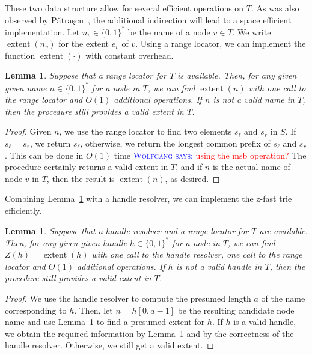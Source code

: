 \documentclass[a4paper,11pt]{article}
\newtheorem{lemma}[theorem]{Lemma}
\newcommand{\?}{\mskip1.5mu}
\newcommand{\Patrascu}{P\v{a}tra\c{s}cu\xspace}
\DeclareMathOperator{\extent}{extent}
\newcommand{\aremark}[3]{\textcolor{blue}{\textsc{#1 #2:}}
  \textcolor{red}{\textsf{#3}}}
\newcommand{\wolfgang}[2][says]{\aremark{Wolfgang}{#1}{#2}}
\begin{document}
These two data structure allow for several efficient operations
on $T$. As was also observed by \Patrascu~\cite{Patrascu10}, the 
additional indirection will lead to a space efficient implementation.
Let $n_v \in \{0, 1\}^*$ be the name of a node $v \in T$. We 
write $\extent(n_v)$ for the extent $e_v$ of $v$. Using a range locator,
we can implement the function $\extent(\cdot)$ with constant overhead.

\begin{lemma}\label{lem:getextent}
Suppose that a range locator for $T$ is available. Then, for any
given given name $n \in \{0, 1\}^*$ for a node in $T$, we can
find $\extent(n)$ with one call to the range locator and $O(1)$
additional operations.  If $n$ is not a valid name in $T$, then
the procedure still provides a valid extent in $T$.
\end{lemma}

\begin{proof}
Given $n$, we use the range locator to find 
two elements $s_\ell$ and $s_r$ in $S$.
If $s_\ell = s_r$, we return $s_\ell$,
otherwise, we return the longest common prefix of 
$s_\ell$ and $s_r$. This can be done in
$O(1)$ time \wolfgang{using the msb operation?}
The procedure certainly returns a valid extent
in $T$, and if $n$ is the actual name of node
$v$ in $T$, then the result is $\extent(n)$, 
as desired.
\end{proof}

Combining Lemma~\ref{lem:getextent} with a handle resolver,
we can implement the z-fast trie efficiently.

\begin{lemma}\label{lem:implementz}
Suppose that a handle resolver and a range locator for $T$ are 
available. Then, for any given given handle $h \in \{0, 1\}^*$ for 
a node in $T$, we can
find $Z(h) = \extent(h)$ with one call to the handle resolver, one
call to the range locator and $O(1)$
additional operations.  If $h$ is not a valid handle in $T$, then
the procedure still provides a valid extent in $T$.
\end{lemma}

\begin{proof}
We use the handle resolver to compute the presumed length
$a$ of the name corresponding to $h$.
Then, let $n = h[0, a - 1]$ be the resulting
candidate node name and use Lemma~\ref{lem:getextent}
to find a presumed extent for $h$.
If $h$ is a valid handle, we obtain the required information by
Lemma~\ref{lem:getextent} and by the correctness of the handle 
resolver. Otherwise, we still get a valid extent.
\end{proof}
\end{document}
